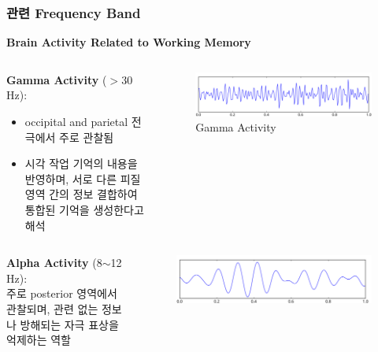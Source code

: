 \documentclass{beamer}
\begin{document}
\subsubsection{관련 Frequency Band}
\begin{frame}{\textbf{Brain Activity Related to Working Memory}}
  \begin{columns}
    \begin{column}{0.52\textwidth}
      \large
      \textbf{Gamma Activity} ($>$30 Hz):
      \vspace{-0.5em}
      \begin{itemize}
        \setlength{\itemsep}{0em}
        \setlength{\parskip}{0em}
        \item occipital and parietal 전극에서 주로 관찰됨
        \item 시각 작업 기억의 내용을 반영하며, 서로 다른 피질 영역 간의 정보 결합하여 통합된 기억을 생성한다고 해석
      \end{itemize}
    \end{column}
    \hfill
    \begin{column}{0.48\textwidth}
      \centering
      \begin{figure}
        \centering
        \includegraphics[width=\textwidth]{image/gamma}
        \caption{Gamma Activity}
      \end{figure}
    \end{column}
  \end{columns}
  \vspace{-0.5em}
  \begin{columns}
    \begin{column}{0.52\textwidth}
      \large
      \textbf{Alpha Activity} (8$\sim$12 Hz):\\주로 posterior 영역에서 관찰되며, 관련 없는 정보나 방해되는 자극 표상을 억제하는 역할
    \end{column}
    \hfill
    \begin{column}{0.48\textwidth}
      \centering
      \begin{figure}
        \centering
        \includegraphics[width=\textwidth]{image/alpha}

\end{figure}
\end{column}
\end{columns}
\end{frame}
\end{document}
